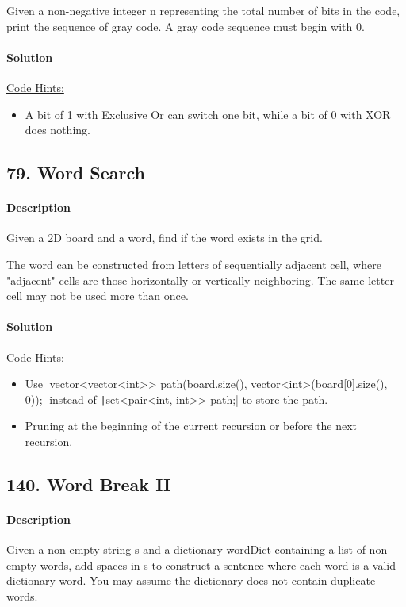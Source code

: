 Given a non-negative integer n representing the total number of bits in the code, print the sequence of gray code. A gray code sequence must begin with 0.

\paragraph{\color{white} \colorbox{OliveGreen}{Solution}}
\underline{Code Hints:}
\begin{itemize}
    \item A bit of 1 with Exclusive Or can switch one bit, while a bit of 0 with XOR does nothing.
\end{itemize}

\subsection{79. Word Search}

\paragraph{\color{white} \colorbox{Mahogany}{Description}}
Given a 2D board and a word, find if the word exists in the grid.

The word can be constructed from letters of sequentially adjacent cell, where "adjacent" cells are those horizontally or vertically neighboring. The same letter cell may not be used more than once.

\paragraph{\color{white} \colorbox{OliveGreen}{Solution}}
\underline{Code Hints:}
\begin{itemize}
    \item Use |vector<vector<int>> path(board.size(), vector<int>(board[0].size(), 0));| instead of \texttt|set<pair<int, int>> path;| to store the path.
    \item Pruning at the beginning of the current recursion or before the next recursion.
\end{itemize}

\subsection{140. Word Break II}

\paragraph{\color{white} \colorbox{Mahogany}{Description}}
Given a non-empty string s and a dictionary wordDict containing a list of non-empty words, add spaces in s to construct a sentence where each word is a valid dictionary word. You may assume the dictionary does not contain duplicate words.

